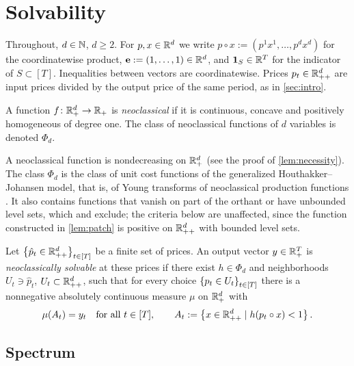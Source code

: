 \section{Solvability}\label{sec:solvability}

Throughout, $d\in\N$, $d\ge2$. For $p,x\in\R^d$ we write $p\circ x:=(p^1x^1,\dots,p^dx^d)$ for the coordinatewise product, $\e:=(1,\dots,1)\in\R^d$, and $\ind S\in\R^T$ for the indicator of $S\subset[T]$. Inequalities between vectors are coordinatewise. Prices $p_t\in\Rpp[d]$ are input prices divided by the output price of the same period, as in \cref{sec:intro}.

\begin{definition}\label{def:neoclassical}
A function $f\colon\Rp[d]\to\R_+$ is \emph{neoclassical} if it is continuous, concave and positively homogeneous of degree one. The class of neoclassical functions of $d$ variables is denoted $\Phi_d$.
\end{definition}

A neoclassical function is nondecreasing on $\Rp[d]$ (see the proof of \cref{lem:necessity}). The class $\Phi_d$ is the class of unit cost functions of the generalized Houthakker--Johansen model, that is, of Young transforms of neoclassical production functions \citep{Shananin1997a}. It also contains functions that vanish on part of the orthant or have unbounded level sets, which \citet{Shananin1999} and \citet{Agaltsov2016} exclude; the criteria below are unaffected, since the function constructed in \cref{lem:patch} is positive on $\Rpp[d]$ with bounded level sets.

\begin{definition}\label{def:neo-solvability}
Let $\set{\hat p_t\in\Rpp[d]}_{t\in[T]}$ be a finite set of prices. An output vector $y\in\Rp[T]$ is \emph{neoclassically solvable} at these prices if there exist $h\in\Phi_d$ and neighborhoods $U_t\ni\hat p_t$, $U_t\subset\Rpp[d]$, such that for every choice $\set{p_t\in U_t}_{t\in[T]}$ there is a nonnegative absolutely continuous measure $\mu$ on $\Rp[d]$ with
\[
\mu(A_t)=y_t\quad\text{for all }t\in[T],\qquad A_t:=\set{x\in\Rpp[d]\mid h(p_t\circ x)<1}.
\]
\end{definition}

\subsection{Spectrum}

